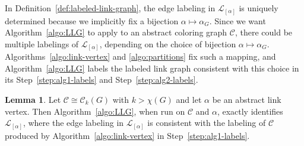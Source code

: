 \documentclass{amsart}
\theoremstyle{hypothesisstyle}
\theoremstyle{definition}
\newtheorem{lemma}[theorem]{Lemma}
\theoremstyle{remark}
\numberwithin{equation}{section}
\newcommand{\C}{\mathcal C}
\begin{document}
In Definition~\ref{def:labeled-link-graph}, the edge labeling in $\mathcal{L}_{[\alpha]}$ is uniquely determined because we implicitly fix a bijection $\alpha\mapsto\alpha_G$. Since we want Algorithm~\ref{algo:LLG} to apply to an abstract coloring graph $\mathcal{C}$, there could be multiple labelings of $\mathcal{L}_{[\alpha]}$, depending on the choice of bijection $\alpha\mapsto\alpha_G$. Algorithms~\ref{algo:link-vertex} and \ref{algo:partitions} fix such a mapping, and Algorithm~\ref{algo:LLG} labels the labeled link graph consistent with this choice in its Step~\ref{step:alg1-labels} and Step~\ref{step:alg2-labels}.

\begin{lemma}\label{lem:unique-LLG-labeling} Let $\C\cong \C_k(G)$ with $k>\chi(G)$ and let $\alpha$ be an abstract link vertex. Then Algorithm~\ref{algo:LLG}, when run on $\mathcal{C}$ and $\alpha$, exactly identifies $\mathcal{L}_{[\alpha]}$, where the edge labeling in $\mathcal{L}_{[\alpha]}$ is consistent with the labeling of $\mathcal{C}$ produced by Algorithm~\ref{algo:link-vertex} in Step~\ref{step:alg1-labels}. 
\end{lemma}
\end{document}
